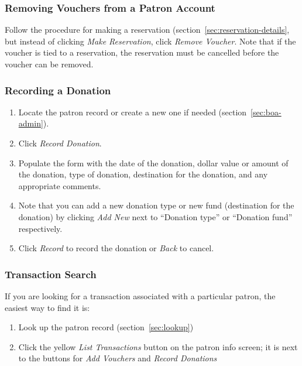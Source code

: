 \subsubsection{Removing Vouchers from a Patron Account}

Follow the procedure for making a reservation
(section~\ref{sec:reservation-details}, but instead of clicking
\emph{Make Reservation}, click \emph{Remove Voucher}. Note that if the
voucher is tied to a reservation, the reservation must be cancelled
before the voucher can be removed.

\subsubsection{Recording a Donation}

\begin{enumerate}
\item  Locate the patron record or create a new one if needed
  (section~\ref{sec:boa-admin}). 
\item Click \emph{Record Donation}.
\item Populate the form with the date of the donation, dollar value or
  amount of the donation, type of donation, destination for the
  donation, and any appropriate comments.
\item Note that you can add a new donation type or new fund (destination
  for the donation) by clicking \emph{Add New} next to ``Donation type''
  or ``Donation fund'' respectively.
\item Click \emph{Record} to record the donation or \emph{Back} to
  cancel. 

\end{enumerate}

\subsubsection{Transaction Search}
\label{sec:txnsearch}

If you are looking for a transaction associated with a particular
patron, the easiest way to find it is:

\begin{enumerate}
\item Look up the patron record (section~\ref{sec:lookup})
\item Click the yellow \emph{List Transactions} button on the patron
  info screen; it is next to the buttons for \emph{Add Vouchers} and
  \emph{Record Donations}
\end{enumerate}

